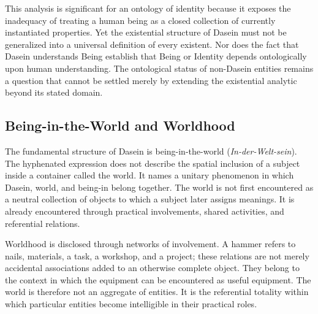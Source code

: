 \label{para:VS.B01.P01.C08.S11.SS04.P004}

This analysis is significant for an ontology of identity
because it exposes the inadequacy of treating a human
being as a closed collection of currently instantiated
properties. Yet the existential structure of Dasein
must not be generalized into a universal definition
of every existent. Nor does the fact that Dasein
understands Being establish that Being or Identity
depends ontologically upon human understanding.
The ontological status of non-Dasein entities remains
a question that cannot be settled merely by extending
the existential analytic beyond its stated domain.



\subsection{Being-in-the-World and Worldhood}
\label{subsec:ch08-heidegger-worldhood}

\label{para:VS.B01.P01.C08.S11.SS05.P001}

The fundamental structure of Dasein is being-in-the-world
(\textit{In-der-Welt-sein}). The hyphenated expression
does not describe the spatial inclusion of a subject
inside a container called the world. It names a unitary
phenomenon in which Dasein, world, and being-in belong
together. The world is not first encountered as a
neutral collection of objects to which a subject later
assigns meanings. It is already encountered through
practical involvements, shared activities, and
referential relations.
\cite[§§12--14]{HeideggerBeingTime}



\label{para:VS.B01.P01.C08.S11.SS05.P002}

Worldhood is disclosed through networks of involvement.
A hammer refers to nails, materials, a task, a workshop,
and a project; these relations are not merely accidental
associations added to an otherwise complete object.
They belong to the context in which the equipment can
be encountered as useful equipment. The world is
therefore not an aggregate of entities. It is the
referential totality within which particular entities
become intelligible in their practical roles.
\cite[§§15--18]{HeideggerBeingTime}

